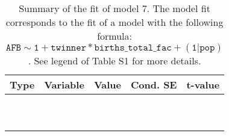 \begin{table}

\caption{\label{tab:tab7}Summary of the fit of model 7. The model fit corresponds to the fit of a model with the following formula: {\small$\mathtt{AFB \sim 1 + twinner * births\_total\_fac + (1 | pop)}$}. See legend of Table S1 for more details.}
\centering
\fontsize{8}{10}\selectfont
\begin{tabular}[t]{>{\raggedright\arraybackslash}p{3cm}>{\raggedright\arraybackslash}p{5cm}rrr}
\toprule
Type & Variable & Value & Cond. SE & t-value\\
\midrule
\cellcolor{gray!6}{fixed effects} & \cellcolor{gray!6}{$\beta_1$} & \cellcolor{gray!6}{5.86} & \cellcolor{gray!6}{0.0123} & \cellcolor{gray!6}{479}\\
\cellcolor{gray!6}{} & \cellcolor{gray!6}{$\beta_{\mathtt{twinner}}$} & \cellcolor{gray!6}{0.0752} & \cellcolor{gray!6}{0.0207} & \cellcolor{gray!6}{3.63}\\
\cellcolor{gray!6}{} & \cellcolor{gray!6}{$\beta_{\mathtt{births\_total\_fac2}}$} & \cellcolor{gray!6}{-0.0396} & \cellcolor{gray!6}{0.00461} & \cellcolor{gray!6}{-8.6}\\
\cellcolor{gray!6}{} & \cellcolor{gray!6}{$\beta_{\mathtt{births\_total\_fac3}}$} & \cellcolor{gray!6}{-0.0686} & \cellcolor{gray!6}{0.00462} & \cellcolor{gray!6}{-14.8}\\
\cellcolor{gray!6}{} & \cellcolor{gray!6}{$\beta_{\mathtt{births\_total\_fac4}}$} & \cellcolor{gray!6}{-0.0977} & \cellcolor{gray!6}{0.00465} & \cellcolor{gray!6}{-21}\\
\cellcolor{gray!6}{} & \cellcolor{gray!6}{$\beta_{\mathtt{births\_total\_fac5}}$} & \cellcolor{gray!6}{-0.122} & \cellcolor{gray!6}{0.00477} & \cellcolor{gray!6}{-25.6}\\
\cellcolor{gray!6}{} & \cellcolor{gray!6}{$\beta_{\mathtt{births\_total\_fac6}}$} & \cellcolor{gray!6}{-0.156} & \cellcolor{gray!6}{0.00486} & \cellcolor{gray!6}{-32.1}\\
\cellcolor{gray!6}{} & \cellcolor{gray!6}{$\beta_{\mathtt{births\_total\_fac7}}$} & \cellcolor{gray!6}{-0.182} & \cellcolor{gray!6}{0.00513} & \cellcolor{gray!6}{-35.5}\\
\cellcolor{gray!6}{} & \cellcolor{gray!6}{$\beta_{\mathtt{births\_total\_fac8}}$} & \cellcolor{gray!6}{-0.217} & \cellcolor{gray!6}{0.00536} & \cellcolor{gray!6}{-40.5}\\
\cellcolor{gray!6}{} & \cellcolor{gray!6}{$\beta_{\mathtt{births\_total\_fac9}}$} & \cellcolor{gray!6}{-0.244} & \cellcolor{gray!6}{0.00601} & \cellcolor{gray!6}{-40.7}\\

\end{tabular}
\end{table}
